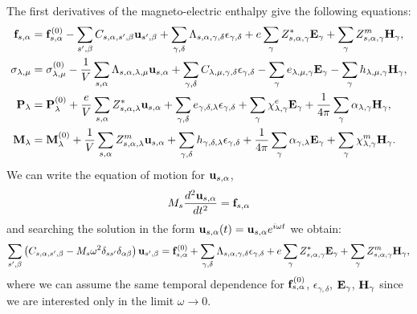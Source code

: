 \documentclass[12pt,a4paper,twoside]{report}
\begin{document}
{\color{orange}
The first derivatives of the magneto-electric enthalpy give the following equations:
\begin{align}
{\bf f}_{s,\alpha}&= {\bf f}^{(0)}_{s,\alpha}
-\sum_{s',\beta} C_{s,\alpha,s',\beta} {\bf u}_{s',\beta}
+\sum_{\gamma,\delta}
\Lambda_{s,\alpha,\gamma,\delta} 
\epsilon_{\gamma,\delta} +
e \sum_{\gamma} Z^*_{s,\alpha,\gamma} {\bf E}_{\gamma}
+\sum_{\gamma} 
Z^m_{s,\alpha,\gamma} {\bf H}_{\gamma}, \\
\sigma_{\lambda,\mu}&=  \sigma_{\lambda,\mu}^{(0)}
-{1\over V} \sum_{s,\alpha}
\Lambda_{s,\alpha,\lambda,\mu} {\bf u}_{s,\alpha}
+\sum_{\gamma,\delta} C_{\lambda,\mu,\gamma,\delta}  
\epsilon_{\gamma,\delta} -
\sum_{\gamma} e_{\lambda,\mu,\gamma} 
 {\bf E}_{\gamma}
-\sum_{\gamma}  h_{\lambda,\mu,\gamma} 
{\bf H}_{\gamma}, \\
{\bf P}_{\lambda}&= {\bf P}^{(0)}_{\lambda}
+{e\over V} \sum_{s,\alpha} Z^*_{s,\alpha,\lambda} 
{\bf u}_{s,\alpha} +
\sum_{\gamma,\delta} e_{\gamma,\delta,\lambda} 
\epsilon_{\gamma,\delta} +
\sum_{\gamma} 
\chi^e_{\lambda,\gamma}
{\bf E}_{\gamma} +
{1\over 4 \pi} \sum_{\gamma} \alpha_{\lambda,\gamma} 
{\bf H}_{\gamma}, \\
{\bf M}_{\lambda}&= {\bf M}^{(0)}_{\lambda}
+{1\over V}\sum_{s,\alpha} 
Z^m_{s,\alpha,\lambda} {\bf u}_{s,\alpha} +
\sum_{\gamma,\delta}  h_{\gamma,\delta,\lambda} 
\epsilon_{\gamma,\delta} 
+{1\over 4 \pi} \sum_{\gamma} \alpha_{\gamma,\lambda} {\bf E}_{\gamma}
+\sum_{\gamma} 
\chi^m_{\lambda,\gamma}
{\bf H}_{\gamma}.
\end{align}
We can write the equation of motion for ${\bf u}_{s,\alpha}$,
\begin{equation}
M_s {d^2 {\bf u}_{s,\alpha} \over d t^2} = {\bf f}_{s,\alpha}
\end{equation}
and searching the solution in the form ${\bf u}_{s,\alpha}(t)=
{\bf u}_{s,\alpha} e^{i\omega t}$ we obtain:
\begin{equation}
\sum_{s',\beta} \left(C_{s,\alpha,s',\beta} - 
M_s \omega^2 \delta_{ss'}\delta_{\alpha\beta}\right)
{\bf u}_{s',\beta}= {\bf f}^{(0)}_{s,\alpha} + \sum_{\gamma,\delta} 
\Lambda_{s,\alpha,\gamma,\delta} \epsilon_{\gamma,\delta}
+ e \sum_{\gamma} Z^*_{s,\alpha,\gamma} {\bf E}_{\gamma} 
+ \sum_{\gamma} Z^m_{s,\alpha,\gamma} 
{\bf H}_{\gamma},
\end{equation}
where we can assume the same temporal dependence for
${\bf f}^{(0)}_{s,\alpha}$, $\epsilon_{\gamma,\delta}$,
${\bf E}_{\gamma}$,
${\bf H}_{\gamma}$ since we are interested only in the limit
$\omega \rightarrow 0$.
}
\end{document}
